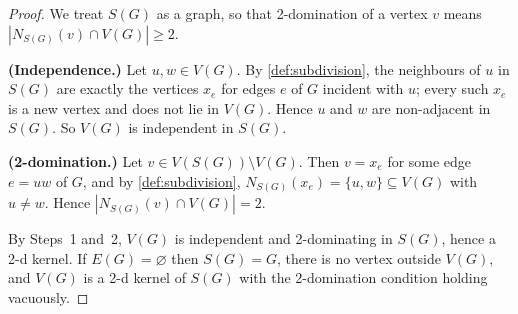 \documentclass[11pt]{article}
\numberwithin{equation}{section}
\theoremstyle{plain}
\newcommand{\V}{V}
\begin{document}
\begin{proof}
We treat $S(G)$ as a graph, so that 2-domination of a vertex $v$ means
$|N_{S(G)}(v)\cap\V(G)|\ge 2$.

\begin{steps}
\item\textbf{(Independence.)}
Let $u,w\in\V(G)$. By \cref{def:subdivision}, the neighbours of $u$ in $S(G)$ are
exactly the vertices $x_e$ for edges $e$ of $G$ incident with $u$; every such $x_e$ is a
new vertex and does not lie in $\V(G)$. Hence $u$ and $w$ are non-adjacent in $S(G)$. So
$\V(G)$ is independent in $S(G)$.

\item\textbf{(2-domination.)}
Let $v\in\V(S(G))\setminus\V(G)$. Then $v=x_e$ for some edge $e=uw$ of $G$, and by
\cref{def:subdivision}, $N_{S(G)}(x_e)=\{u,w\}\subseteq\V(G)$ with $u\neq w$. Hence
$|N_{S(G)}(v)\cap\V(G)|=2$.
\end{steps}

By Steps~1 and~2, $\V(G)$ is independent and 2-dominating in $S(G)$, hence a 2-d kernel.
If $E(G)=\varnothing$ then $S(G)=G$, there is no vertex outside $\V(G)$, and $\V(G)$ is a
2-d kernel of $S(G)$ with the 2-domination condition holding vacuously.
\end{proof}
\end{document}
